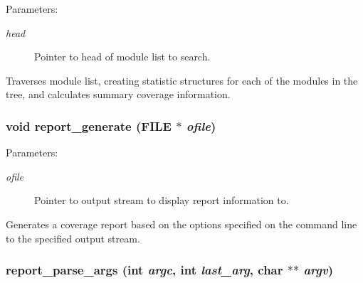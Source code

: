 \begin{Desc}
\item[Parameters: ]\par
\begin{description}
\item[{\em 
head}]Pointer to head of module list to search.\end{description}
\end{Desc}
Traverses module list, creating statistic structures for each of the modules in the tree, and calculates summary coverage information. 
\subsubsection{\setlength{\rightskip}{0pt plus 5cm}void report\_\-generate (FILE $\ast$ {\em ofile})}\label{report_8c_a16}


\begin{Desc}
\item[Parameters: ]\par
\begin{description}
\item[{\em 
ofile}]Pointer to output stream to display report information to.\end{description}
\end{Desc}
Generates a coverage report based on the options specified on the command line to the specified output stream. 
\subsubsection{ report\_\-parse\_\-args (int {\em argc}, int {\em last\_\-arg}, char $\ast$$\ast$ {\em argv})}\label{report_8c_a12}


